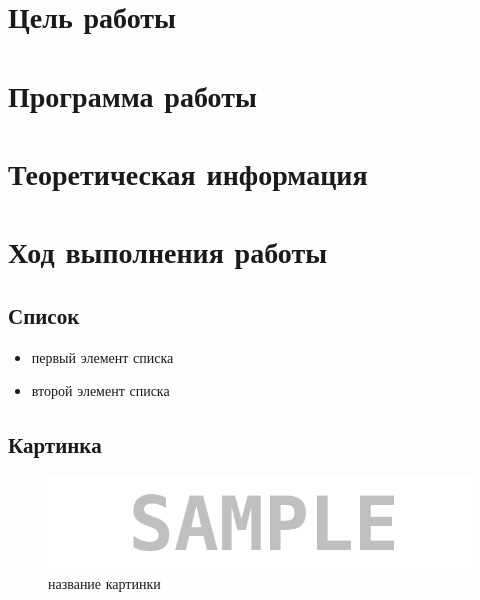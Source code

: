 







\section{Цель работы}


\section{Программа работы}


\section{Теоретическая информация}


\section{Ход выполнения работы}

\subsection{Список}

\begin{itemize}
\item первый элемент списка
\item второй элемент списка
\end{itemize}


\subsection{Картинка}

\begin{figure}[H]
	\begin{center}
		\includegraphics[scale=0.7]{pics/sample}
		\caption{название картинки} 
		\label{pic:pic_name} %
	\end{center}
\end{figure}


